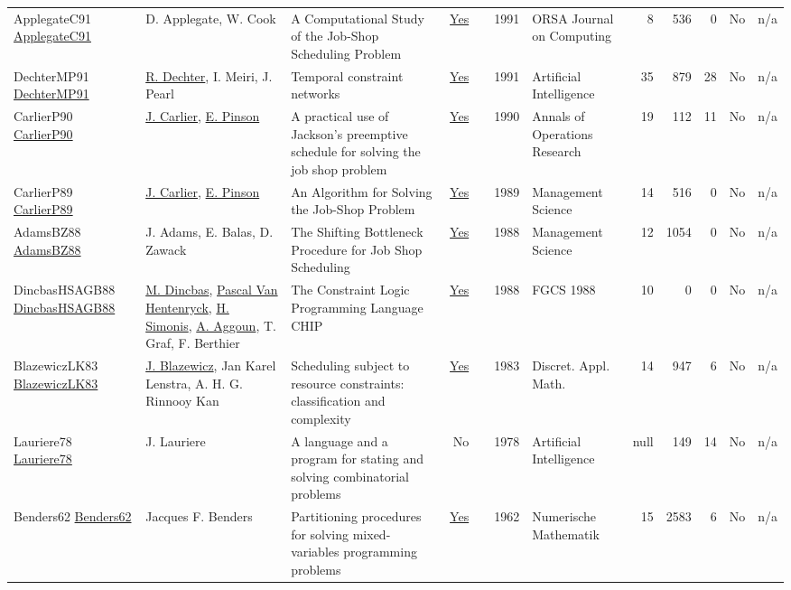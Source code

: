 {\begin{longtable}{>{\raggedright\arraybackslash}p{3cm}>{\raggedright\arraybackslash}p{6cm}>{\raggedright\arraybackslash}p{6.5cm}rrrp{2.5cm}rrrrr}
ApplegateC91 \href{http://dx.doi.org/10.1287/ijoc.3.2.149}{ApplegateC91} & D. Applegate, W. Cook & A Computational Study of the Job-Shop Scheduling Problem & \href{works/ApplegateC91.pdf}{Yes} & \cite{ApplegateC91} & 1991 & ORSA Journal on Computing & 8 & 536 & 0 & No & n/a\\
DechterMP91 \href{http://dx.doi.org/10.1016/0004-3702(91)90006-6}{DechterMP91} & \hyperref[auth:a303]{R. Dechter}, I. Meiri, J. Pearl & Temporal constraint networks & \href{works/DechterMP91.pdf}{Yes} & \cite{DechterMP91} & 1991 & Artificial Intelligence & 35 & 879 & 28 & No & n/a\\
CarlierP90 \href{http://dx.doi.org/10.1007/bf03543071}{CarlierP90} & \hyperref[auth:a858]{J. Carlier}, \hyperref[auth:a859]{E. Pinson} & A practical use of Jackson's preemptive schedule for solving the job shop problem & \href{works/CarlierP90.pdf}{Yes} & \cite{CarlierP90} & 1990 & Annals of Operations Research & 19 & 112 & 11 & No & n/a\\
CarlierP89 \href{http://dx.doi.org/10.1287/mnsc.35.2.164}{CarlierP89} & \hyperref[auth:a858]{J. Carlier}, \hyperref[auth:a859]{E. Pinson} & An Algorithm for Solving the Job-Shop Problem & \href{works/CarlierP89.pdf}{Yes} & \cite{CarlierP89} & 1989 & Management Science & 14 & 516 & 0 & No & n/a\\
AdamsBZ88 \href{http://dx.doi.org/10.1287/mnsc.34.3.391}{AdamsBZ88} & J. Adams, E. Balas, D. Zawack & The Shifting Bottleneck Procedure for Job Shop Scheduling & \href{works/AdamsBZ88.pdf}{Yes} & \cite{AdamsBZ88} & 1988 & Management Science & 12 & 1054 & 0 & No & n/a\\
DincbasHSAGB88 \href{}{DincbasHSAGB88} & \hyperref[auth:a726]{M. Dincbas}, \hyperref[auth:a149]{Pascal Van Hentenryck}, \hyperref[auth:a17]{H. Simonis}, \hyperref[auth:a734]{A. Aggoun}, T. Graf, F. Berthier & The Constraint Logic Programming Language {CHIP} & \href{works/DincbasHSAGB88.pdf}{Yes} & \cite{DincbasHSAGB88} & 1988 & FGCS 1988 & 10 & 0 & 0 & No & n/a\\
BlazewiczLK83 \href{https://doi.org/10.1016/0166-218X(83)90012-4}{BlazewiczLK83} & \hyperref[auth:a775]{J. Blazewicz}, Jan Karel Lenstra, A. H. G. Rinnooy Kan & Scheduling subject to resource constraints: classification and complexity & \href{works/BlazewiczLK83.pdf}{Yes} & \cite{BlazewiczLK83} & 1983 & Discret. Appl. Math. & 14 & 947 & 6 & No & n/a\\
Lauriere78 \href{http://dx.doi.org/10.1016/0004-3702(78)90029-2}{Lauriere78} & J. Lauriere & A language and a program for stating and solving combinatorial problems & No & \cite{Lauriere78} & 1978 & Artificial Intelligence & null & 149 & 14 & No & n/a\\
Benders62 \href{http://dx.doi.org/10.1007/bf01386316}{Benders62} & Jacques F. Benders & Partitioning procedures for solving mixed-variables programming problems & \href{works/Benders62.pdf}{Yes} & \cite{Benders62} & 1962 & Numerische Mathematik & 15 & 2583 & 6 & No & n/a\\
\end{longtable}
}

